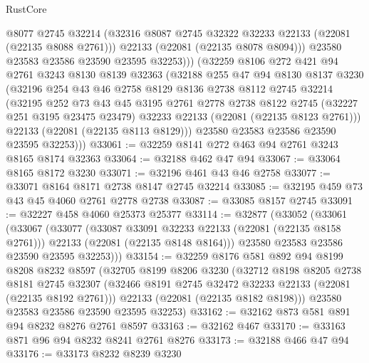 \begin{lexlean}{RustCore}
\begin{coremodule}
              @8077
              @2745
              @32214
              (@32316 @8087 @2745 @32322 @32233 @22133 (@22081 (@22135 @8088 @2761)))
              @22133
              (@22081 (@22135 @8078 @8094)))
            @23580
            @23583
            @23586
            @23590
            @23595
            @32253)))
      (@32259
        @8106
        @272
        @421
        @94
        @2761
        @3243
        @8130
        @8139
        @32363
        (@32188
          @255
          @47
          @94
          @8130
          @8137
          @3230
          (@32196
            @254
            @43
            @46
            @2758
            @8129
            @8136
            @2738
            @8112
            @2745
            @32214
            (@32195
              @252
              @73
              @43
              @45
              @3195
              @2761
              @2778
              @2738
              @8122
              @2745
              (@32227 @251 @3195 @23475 @23479)
              @32233
              @22133
              (@22081 (@22135 @8123 @2761)))
            @22133
            (@22081 (@22135 @8113 @8129)))
          @23580
          @23583
          @23586
          @23590
          @23595
          @32253)))
@33061 := @32259 @8141 @272 @463 @94 @2761 @3243 @8165 @8174 @32363
@33064 := @32188 @462 @47 @94
@33067 := @33064 @8165 @8172 @3230
@33071 := @32196 @461 @43 @46 @2758
@33077 := @33071 @8164 @8171 @2738 @8147 @2745 @32214
@33085 := @32195 @459 @73 @43 @45 @4060 @2761 @2778 @2738
@33087 := @33085 @8157 @2745
@33091 := @32227 @458 @4060 @25373 @25377
@33114 := @32877
    (@33052
      (@33061
        (@33067
          (@33077
            (@33087 @33091 @32233 @22133 (@22081 (@22135 @8158 @2761)))
            @22133
            (@22081 (@22135 @8148 @8164)))
          @23580
          @23583
          @23586
          @23590
          @23595
          @32253)))
@33154 := @32259
    @8176
    @581
    @892
    @94
    @8199
    @8208
    @8232
    @8597
    (@32705
      @8199
      @8206
      @3230
      (@32712
        @8198
        @8205
        @2738
        @8181
        @2745
        @32307
        (@32466 @8191 @2745 @32472 @32233 @22133 (@22081 (@22135 @8192 @2761)))
        @22133
        (@22081 (@22135 @8182 @8198)))
      @23580
      @23583
      @23586
      @23590
      @23595
      @32253)
@33162 := @32162 @873 @581 @891 @94 @8232 @8276 @2761 @8597
@33163 := @32162 @467
@33170 := @33163 @871 @96 @94 @8232 @8241 @2761 @8276
@33173 := @32188 @466 @47 @94
@33176 := @33173 @8232 @8239 @3230

\end{coremodule}
\end{lexlean}
